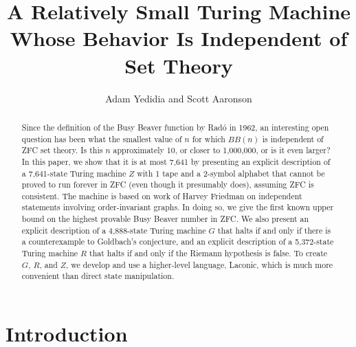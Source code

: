 \documentclass[11pt]{article}
\newcommand{\statenumstate}{7,641-state }
\newcommand{\statenum}{7,641 }
\newcommand{\gbstatenumstate}{4,888-state }
\newcommand{\rmstatenumstate}{5,372-state }
\begin{document}
\title{A Relatively Small Turing Machine Whose Behavior Is Independent of Set Theory}
\author{Adam Yedidia and Scott Aaronson}

\maketitle

\begin{abstract}

Since the definition of the Busy Beaver function by Rad\'{o} in 1962, an interesting open question has been what the smallest value of $n$ for which $BB(n)$ is independent of ZFC set theory. Is this $n$ approximately 10, or closer to 1,000,000, or is it even larger? In this paper, we show that it is at most \statenum by presenting an explicit description of a \statenumstate Turing machine $Z$ with 1 tape and a 2-symbol alphabet that cannot be proved to run forever in ZFC (even though it presumably does), assuming ZFC is consistent. The machine is based on work of Harvey Friedman on independent statements involving order-invariant graphs. In doing so, we give the first known upper bound on the highest provable Busy Beaver number in ZFC. We also present an explicit description of a \gbstatenumstate Turing machine $G$ that halts if and only if there is a counterexample to Goldbach's conjecture, and an explicit description of a \rmstatenumstate Turing machine $R$ that halts if and only if the Riemann hypothesis is false. To create $G$, $R$, and $Z$, we develop and use a higher-level language, Laconic, which is much more convenient than direct state manipulation. 

\end{abstract}

\section{Introduction}

\end{document}
